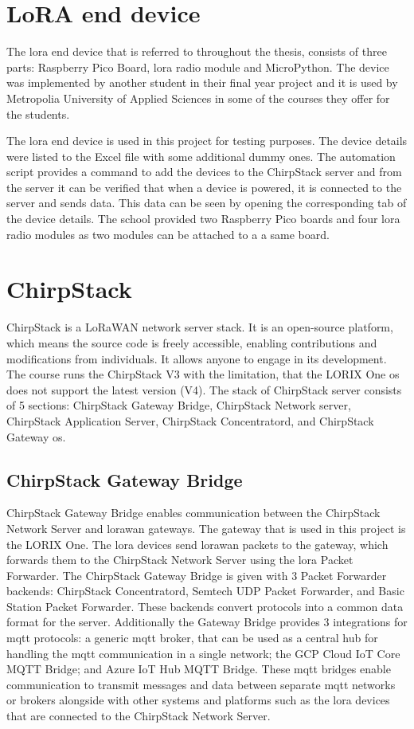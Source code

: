 \section{LoRA end device}
The \gls{lora} end device that is referred to throughout the thesis,  consists of three parts: Raspberry Pico Board, \gls{lora} radio module and MicroPython.
The device was implemented by another student in their final year project\cite{theseus:gere-zoltan} and it is used by Metropolia University of Applied Sciences in some of the courses they offer for the students.


The \gls{lora} end device is used in this project for testing purposes.
The device details were listed to the Excel file with some additional dummy ones.
The automation script provides a command to add the devices to the ChirpStack server and from the server it can be verified that when a device is powered, it is connected to the server and sends data.
This data can be seen by opening the corresponding tab of the device details.
The school provided two Raspberry Pico boards and four \gls{lora} radio modules as two modules can be attached to a a same board.


\section{ChirpStack}
ChirpStack is a LoRaWAN network server stack.
It is an open-source platform, which means the source code is freely accessible, enabling contributions and modifications from individuals. It allows anyone to engage in its development.
The course runs the ChirpStack V3 with the limitation, that the LORIX One \gls{os} does not support the latest version (V4).
The stack of ChirpStack server consists of 5 sections: ChirpStack Gateway Bridge, ChirpStack Network server, ChirpStack Application Server, ChirpStack Concentratord, and ChirpStack Gateway \gls{os}.

\subsection{ChirpStack Gateway Bridge}
ChirpStack Gateway Bridge enables communication between the ChirpStack Network Server and \gls{lorawan} gateways.
The gateway that is used in this project is the LORIX One.
The \gls{lora} devices send \gls{lorawan} packets to the gateway, which forwards them to the ChirpStack Network Server using the \gls{lora} Packet Forwarder.
The ChirpStack Gateway Bridge is given with 3 Packet Forwarder backends: ChirpStack Concentratord, Semtech UDP Packet Forwarder, and Basic Station Packet Forwarder.
These backends convert protocols into a common data format for the server.
Additionally the Gateway Bridge provides 3 integrations for \gls{mqtt} protocols: a generic \gls{mqtt} broker, that can be used as a central hub for handling the \gls{mqtt} communication in a single network; the GCP Cloud IoT Core MQTT Bridge; and Azure IoT Hub MQTT Bridge.
These \gls{mqtt} bridges enable communication to transmit messages and data between separate \gls{mqtt} networks or brokers alongside with other systems and platforms such as the \gls{lora} devices that are connected to the ChirpStack Network Server.
\cite{chirpstack:gatewayBridge}

